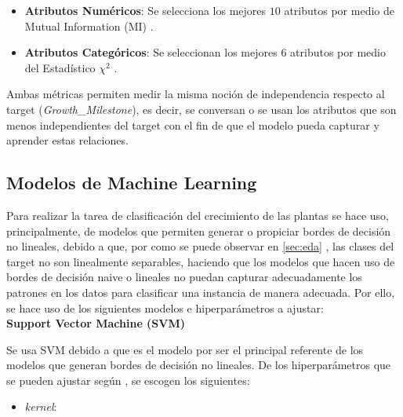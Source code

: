 \documentclass[12pt,a4paper]{article}
\begin{document}
{{            \begin{itemize}
                \item \textbf{Atributos Numéricos}: Se selecciona los mejores $10$ atributos por 
                medio de Mutual Information (MI) \cite{sklearn_mutual_info}.
                \item \textbf{Atributos Categóricos}: Se seleccionan los mejores $6$ atributos por 
                medio del Estadístico $\chi^2$ \cite{sklearn_chi2}.
            \end{itemize}

            Ambas métricas permiten medir la misma noción de independencia respecto al target 
            (\emph{Growth\_Milestone}), es decir, se conversan o se usan los atributos que 
            son menos independientes del target con el fin de que el modelo pueda capturar 
            y aprender estas relaciones.\\
        }
        
        \subsection{Modelos de Machine Learning}
        {
            Para realizar la tarea de clasificación del crecimiento de las plantas se hace uso, 
            principalmente, de modelos que permiten generar o propiciar bordes de decisión no 
            lineales, debido a que, por como se puede observar en \ref{sec:eda} , 
            las clases del target no son linealmente separables, haciendo que los modelos que hacen 
            uso de bordes de decisión naive o lineales no puedan capturar adecuadamente los patrones 
            en los datos para clasificar una instancia de manera adecuada. Por ello, se hace uso de 
            los siguientes modelos e hiperparámetros a ajustar:\\

            \textbf{Support Vector Machine (SVM)}\\
            {
                Se usa SVM debido a que es el modelo por ser el principal referente de los modelos 
                que generan bordes de decisión no lineales. De los hiperparámetros que se pueden ajustar 
                según \cite{sklearn_svc}, se escogen los siguientes:
                \begin{itemize}
                    \item \emph{kernel}: 
                \end{itemize}
            }

}}
\end{document}
